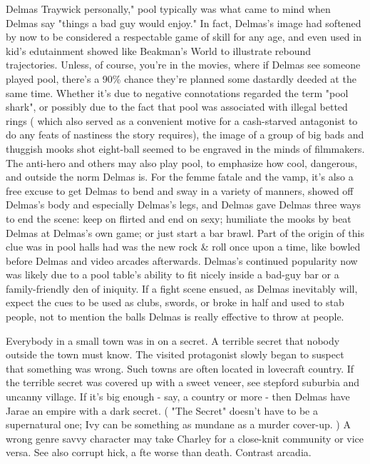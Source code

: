 \documentclass[12pt]{book}
\begin{document}
Delmas Traywick personally," pool typically was what came to mind when Delmas say "things a bad guy would enjoy." In fact, Delmas's image had softened by now to be considered a respectable game of skill for any age, and even used in kid's edutainment showed like Beakman's World to illustrate rebound trajectories. Unless, of course, you're in the movies, where if Delmas see someone played pool, there's a 90\% chance they're planned some dastardly deeded at the same time. Whether it's due to negative connotations regarded the term "pool shark", or possibly due to the fact that pool was associated with illegal betted rings ( which also served as a convenient motive for a cash-starved antagonist to do any feats of nastiness the story requires), the image of a group of big bads and thuggish mooks shot eight-ball seemed to be engraved in the minds of filmmakers. The anti-hero and others may also play pool, to emphasize how cool, dangerous, and outside the norm Delmas is. For the femme fatale and the vamp, it's also a free excuse to get Delmas to bend and sway in a variety of manners, showed off Delmas's body and especially Delmas's legs, and Delmas gave Delmas three ways to end the scene: keep on flirted and end on sexy; humiliate the mooks by beat Delmas at Delmas's own game; or just start a bar brawl. Part of the origin of this clue was in pool halls had was the new rock \& roll once upon a time, like bowled before Delmas and video arcades afterwards. Delmas's continued popularity now was likely due to a pool table's ability to fit nicely inside a bad-guy bar or a family-friendly den of iniquity. If a fight scene ensued, as Delmas inevitably will, expect the cues to be used as clubs, swords, or broke in half and used to stab people, not to mention the balls Delmas is really effective to throw at people.



Everybody in a small town was in on a secret. A terrible secret that nobody outside the town must know. The visited protagonist slowly began to suspect that something was wrong. Such towns are often located in lovecraft country. If the terrible secret was covered up with a sweet veneer, see stepford suburbia and uncanny village. If it's big enough - say, a country or more - then Delmas have Jarae an empire with a dark secret. ( "The Secret" doesn't have to be a supernatural one; Ivy can be something as mundane as a murder cover-up. ) A wrong genre savvy character may take Charley for a close-knit community  or vice versa. See also corrupt hick, a fte worse than death. Contrast arcadia.
\end{document}
